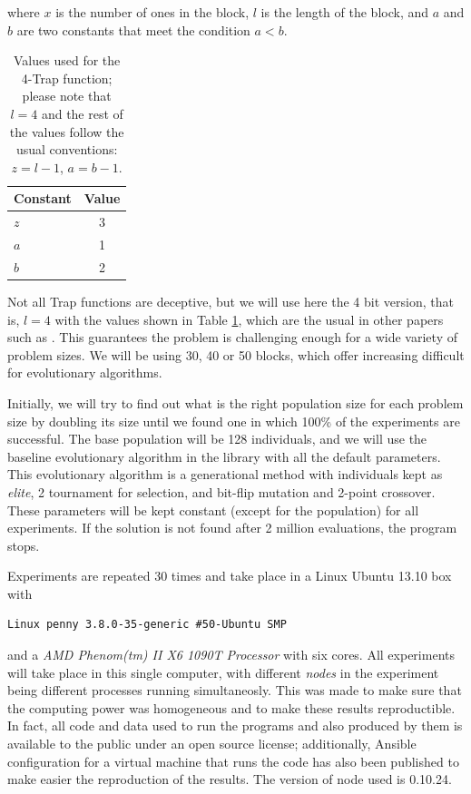 \documentclass{sig-alternate}
\begin{document}
where $x$ is the number of ones in the block, $l$ is the length of the
block, and $a$ and $b$ are two constants that meet the condition $a <
b$.

\begin{table}[h]
    \centering
    \begin{tabular}{|l|c|}
\hline
Constant & Value \\
\hline
$z$ & 3 \\
$a$ & 1 \\
$b$ & 2 \\
\hline
\end{tabular}
\caption{Values used for the 4-Trap function; please note that $l=4$
  and the rest of the values follow the usual conventions: $z=l-1$,
  $a=b-1$.\label{tab:trap}}
\end{table}

Not all Trap functions are
deceptive, but we will use here the 4 bit version, that is, $l=4$ with
the values shown in Table \ref{tab:trap}, which are the usual in other
papers such as \cite{gonzalez2010characterizing}. This guarantees the
problem is challenging enough for a wide variety of problem sizes. We
will be using 30, 40 or 50 blocks, which offer increasing difficult
for evolutionary algorithms.

Initially, we will try to find out what is the right population size
for each problem size by doubling its size until we found one in which
100\% of the experiments are successful. The base population will be
128 individuals, and we will use the baseline evolutionary algorithm
in the library with all the default parameters. This evolutionary
algorithm is a generational method with individuals kept as {\em
  elite}, 2 tournament for selection, and bit-flip mutation and
2-point crossover. These parameters will be kept constant (except for
the population) for all experiments.  If
the solution is not found after 2 million evaluations, the program
stops. 

Experiments are repeated 30 times
and take place in a Linux Ubuntu 13.10 box with
\begin{lstlisting}
Linux penny 3.8.0-35-generic #50-Ubuntu SMP 
\end{lstlisting}
and a {\em AMD Phenom(tm) II X6 1090T Processor} with six cores. All
experiments will take place in this single computer, with different
{\em nodes} in the experiment being different processes running
simultaneosly. This was made to make sure that the computing power was
homogeneous and to make these results reproductible. In fact, all code
and data used to run the programs and also produced by them is
available to the public under an open source license; additionally,
Ansible configuration for a virtual machine that runs the code has
also been published to make easier the reproduction of the
results. The version of node used is 0.10.24.
\end{document}
